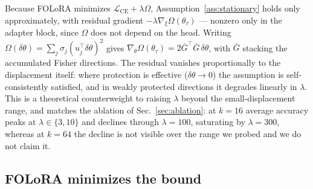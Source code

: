 
\begin{remark}
\label{rem:regularized}
Because FOLoRA minimizes $\mathcal{L}_{\text{CE}}+\lambda\Omega$,
Assumption~\ref{ass:stationary} holds only approximately, with residual gradient
$-\lambda\nabla_\xi\Omega(\theta_\tau)$ --- nonzero only in the adapter block, since
$\Omega$ does not depend on the head. Writing $\Omega(\delta\theta)=\sum_j\sigma_j
(u_j^{\!\top}\delta\theta)^2$ gives $\nabla_\theta\Omega(\theta_\tau)=2\bar{G}^{\!\top}\bar{G}\,\delta\theta$,
with $\bar{G}$ stacking the accumulated Fisher directions. The residual vanishes
proportionally to the displacement itself: where protection is effective
($\delta\theta\!\to\!0$) the assumption is self-consistently satisfied, and in weakly
protected directions it degrades linearly in $\lambda$. This is a theoretical counterweight
to raising $\lambda$ beyond the small-displacement range, and matches the ablation of
Sec.~\ref{sec:ablation}: at $k{=}16$ average accuracy peaks at $\lambda\in\{3,10\}$ and
declines through $\lambda=100$, saturating by $\lambda=300$, whereas at $k{=}64$ the decline
is not visible over the range we probed and we do not claim it.
\end{remark}

\subsection{FOLoRA minimizes the bound}
\label{sec:minimize}

